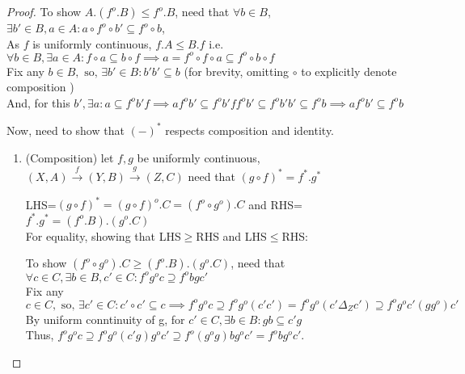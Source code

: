 \documentclass[18pt,a4paper]{article}
\theoremstyle{definition}
\begin{document}
\begin{proof}
			To show $A.(f^o .B) \leq f^o .B$, need that $\forall b \in B$,
			$\exists b' \in B, a\in A : a \circ f^o \circ b' \subseteq f^o \circ b$,\\
			As $f$ is uniformly continuous, $f.A\leq B.f$ i.e. $\forall b \in B, \exists a \in A
			: f \circ a \subseteq b \circ f
			\implies a= f^o \circ f \circ a \subseteq f^o \circ  b \circ f $   \\
			Fix any $b \in B, \text{ so, } \exists b' \in B : b'b' \subseteq b$
			(for brevity, omitting $\circ$ to explicitly denote composition  )\\
			And, for this $b', \exists a : a \subseteq f^ob'f \implies af^ob' \subseteq f^ob'ff^ob'
			\subseteq f^o b'b' \subseteq f^o b \implies af^ob' \subseteq f^o b$\\
		\item	Now, need to show that $(-)^*$ respects composition and identity.
			\begin{enumerate}[label=(\roman*)]
				\item (Composition) let $f,g$ be uniformly continuous,
					$(X,A) \xrightarrow{f} (Y,B) \xrightarrow{g} (Z,C)$
					need that $(g \circ f)^*= f^*.g^* $

					LHS=$(g \circ f)^*=(g \circ f)^o .C=(f^o \circ g^o).C$ and
					RHS=$f^*.g^* =(f^o .B).(g^o .C)$\\
					For equality, showing that LHS$\geq$RHS and LHS$\leq$RHS:

					To show $(f^o \circ g^o).C\geq(f^o .B).(g^o .C)$, need that
					$\forall c \in C, \exists b \in B, c' \in C : f^og^oc
					\supseteq f^obgc'$ \\
					Fix any $c \in C, \text{ so, } \exists c' \in C: c' \circ c' \subseteq c
					\implies f^o g^o c \supseteq f^o g^o (c'c')
					=f^o g^o (c' \Delta_Z c') \supseteq f^o g^o c'(gg^o)c'$ \\
					By uniform conntinuity of g, for $c'\in C,\exists b\in B: gb\subseteq c'g $
					\\Thus, $f^o g^o c \supseteq f^o g^o (c'g)g^oc' \supseteq
					f^o (g^o g)bg^o c'=f^o bg^o c'$.


\end{enumerate}
\end{proof}
\end{document}
